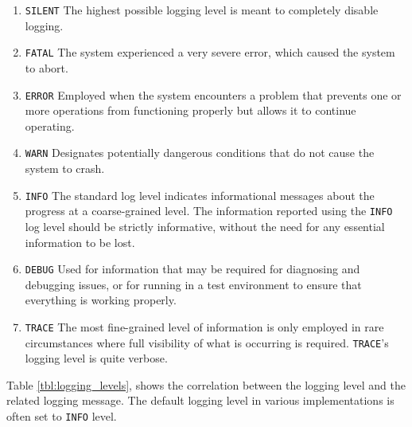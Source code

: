 \begin{enumerate}
  \item[\protect\icircled{\texttt{7}}] \texttt{SILENT}
    \newline
    The highest possible logging level is meant to completely disable logging.

  \item[\protect\icircled{\texttt{6}}] \texttt{FATAL}
    \newline
    The system experienced a very severe error, which caused the system to abort.

  \item[\protect\icircled{\texttt{5}}] \texttt{ERROR}
    \newline
    Employed when the system encounters a problem that prevents one or more operations
    from functioning properly but allows it to continue operating.

  \item[\protect\icircled{\texttt{4}}] \texttt{WARN}
    \newline
    Designates potentially dangerous conditions that do not cause the system to crash.

  \item[\protect\icircled{\texttt{3}}] \texttt{INFO}
    \newline
    The standard log level indicates informational messages about the progress at
    a coarse-grained level. The information reported using the \texttt{INFO} log
    level should be strictly informative, without the need for any essential
    information to be lost.

  \item[\protect\icircled{\texttt{2}}] \texttt{DEBUG}
    \newline
    Used for information that may be required for diagnosing and debugging issues,
    or for running in a test environment to ensure that everything is working
    properly.

  \item[\protect\icircled{\texttt{1}}] \texttt{TRACE}
    \newline
    The most fine-grained level of information is only employed in rare circumstances
    where full visibility of what is occurring is required. \texttt{TRACE}'s logging
    level is quite verbose.
\end{enumerate}

Table \ref{tbl:logging_levels}, shows the correlation between the logging level
and the related logging message. The default logging level in various implementations
is often set to \texttt{INFO} level.

